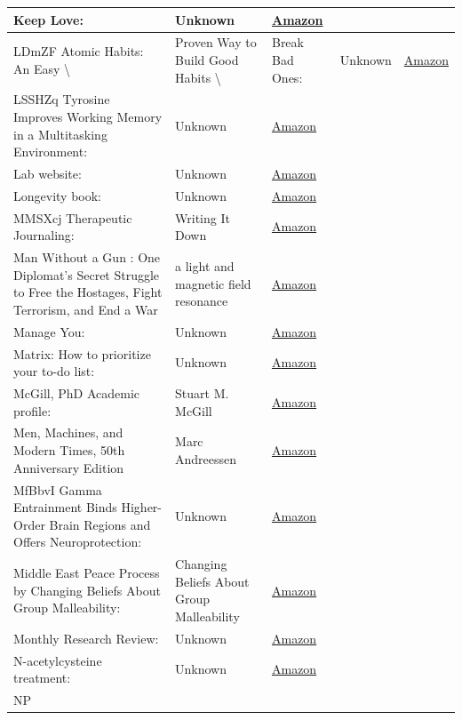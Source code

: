 \documentclass{article}
\begin{document}
\begin{longtable}{|p{8cm}|p{4cm}|p{2.5cm}|}
\hline
Keep Love: & Unknown & \href{https://amzn.to/3LzS1FN}{Amazon} \\
\hline
LDmZF
Atomic Habits: An Easy \textbackslash{}& Proven Way to Build Good Habits \textbackslash{}& Break Bad Ones: & Unknown & \href{https://amzn.to/3ahSLkX}{Amazon} \\
\hline
LSSHZq
Tyrosine Improves Working Memory in a Multitasking Environment: & Unknown & \href{https://amzn.to/3TIWfj2}{Amazon} \\
\hline
Lab website: & Unknown & \href{https://amzn.to/4m3ILuM}{Amazon} \\
\hline
Longevity book: & Unknown & \href{https://amzn.to/41kLirQ}{Amazon} \\
\hline
MMSXcj
Therapeutic Journaling: & Writing It Down & \href{https://amzn.to/47FDnaK}{Amazon} \\
\hline
Man Without a Gun : One Diplomat's Secret Struggle to Free the Hostages, Fight Terrorism, and End a War & a light and magnetic field resonance & \href{https://amzn.to/3RfHTWv}{Amazon} \\
\hline
Manage You: & Unknown & \href{https://amzn.to/3V8PB7H}{Amazon} \\
\hline
Matrix: How to prioritize your to-do list: & Unknown & \href{https://amzn.to/3HO6tJU}{Amazon} \\
\hline
McGill, PhD
Academic profile: & Stuart M. McGill & \href{https://amzn.to/49ZI5jQ}{Amazon} \\
\hline
Men, Machines, and Modern Times, 50th Anniversary Edition & Marc Andreessen & \href{https://amzn.to/45zPmWs}{Amazon} \\
\hline
MfBbvI
Gamma Entrainment Binds Higher-Order Brain Regions and Offers Neuroprotection: & Unknown & \href{https://amzn.to/3xAFVIb}{Amazon} \\
\hline
Middle East Peace Process by Changing Beliefs About Group Malleability: & Changing Beliefs About Group Malleability & \href{https://amzn.to/3W1fnvI}{Amazon} \\
\hline
Monthly Research Review: & Unknown & \href{https://amzn.to/3TVwNHM}{Amazon} \\
\hline
N-acetylcysteine treatment: & Unknown & \href{https://amzn.to/3TUXc9Z}{Amazon} \\
\hline
NP


\end{longtable}
\end{document}
